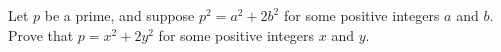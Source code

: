 Let $p$ be a prime, and suppose $p^2=a^2+2b^2$ for some positive integers $a$ and $b$. Prove that $p=x^2+2y^2$ for some positive integers $x$ and $y$.
